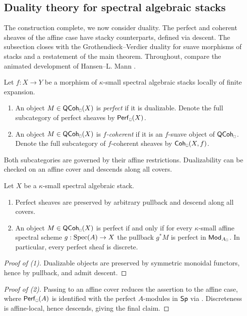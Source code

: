 \subsection{Duality theory for spectral algebraic stacks}\label{subsec: duality theory for spectral algebraic stacks}
The construction complete, we now consider duality. The perfect and coherent sheaves of the affine case have stacky counterparts, defined via descent. The subsection closes with the Grothendieck--Verdier duality for suave morphisms of stacks and a restatement of the main theorem. Throughout, compare the animated development of Hansen--L. Mann \cite[\S 2.8]{HansenMannCLL}.
\begin{definition}\label{def: perfect and coherent sheaves on stacks}
    Let $f: X\to Y$ be a morphism of $\kappa$-small spectral algebraic stacks locally of finite expansion.
    \begin{enumerate}
        \item An object $M\in\QCoh_{\sld}(X)$ is \emph{perfect} if it is dualizable. Denote the full subcategory of perfect sheaves by $\Perf_{\sld}(X)$.
        \item An object $M\in\QCoh_{\sld}(X)$ is \emph{$f$-coherent} if it is an $f$-suave object of $\QCoh_{\sld}$. Denote the full subcategory of $f$-coherent sheaves by $\Coh_{\sld}(X,f)$.
    \end{enumerate}
\end{definition}
Both subcategories are governed by their affine restrictions. Dualizability can be checked on an affine cover and descends along all covers. 
\begin{proposition}\label{prop: perfect sheaves on stacks}
    Let $X$ be a $\kappa$-small spectral algebraic stack.
    \begin{enumerate}
        \item Perfect sheaves are preserved by arbitrary pullback and descend along all covers.
        \item An object $M\in\QCoh_{\sld}(X)$ is perfect if and only if for every $\kappa$-small affine spectral scheme $g:\operatorname{Spec}(A)\to X$ the pullback $g^{*}M$ is perfect in $\Mod_{A_{\sld}}$. In particular, every perfect sheaf is discrete.
    \end{enumerate}
\end{proposition}
\begin{proof}[Proof of (1)]
    Dualizable objects are preserved by symmetric monoidal functors, hence by pullback, and admit descent.
\end{proof}
\begin{proof}[Proof of (2)]
    Passing to an affine cover reduces the assertion to the affine case, where $\Perf_{\sld}(A)$ is identified with the perfect $A$-modules in $\mathsf{Sp}$ via . Discreteness is affine-local, hence descends, giving the final claim.
\end{proof}
